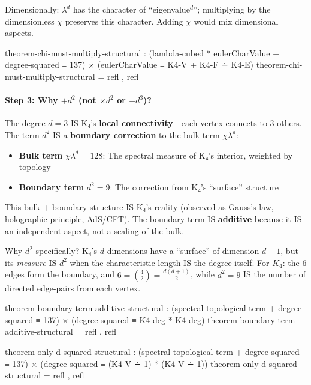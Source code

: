 \documentclass[11pt,a4paper]{book}
\begin{document}
Dimensionally: $\lambda^d$ has the character of ``eigenvalue$^d$''; multiplying by the 
dimensionless $\chi$ preserves this character. Adding $\chi$ would mix dimensional aspects.

\begin{code}
theorem-chi-must-multiply-structural : 
  (lambda-cubed * eulerCharValue + degree-squared ≡ 137) ×
  (eulerCharValue ≡ K4-V + K4-F ∸ K4-E)
theorem-chi-must-multiply-structural = refl , refl
\end{code}

\paragraph{Step 3: Why $+ d^2$ (not $\times d^2$ or $+ d^3$)?}

The degree $d = 3$ IS K₄'s \textbf{local connectivity}—each vertex connects 
to 3 others. The term $d^2$ IS a \textbf{boundary correction} to the bulk 
term $\chi \lambda^d$:

\begin{itemize}
\item \textbf{Bulk term} $\chi \lambda^d = 128$: The spectral measure of K₄'s 
      interior, weighted by topology
\item \textbf{Boundary term} $d^2 = 9$: The correction from K₄'s ``surface'' 
      structure
\end{itemize}

This bulk + boundary structure IS K₄'s reality (observed as Gauss's law, 
holographic principle, AdS/CFT). The boundary term IS \textbf{additive} 
because it IS an independent aspect, not a scaling of the bulk.

Why $d^2$ specifically? K₄'s $d$ dimensions have a ``surface'' of dimension $d-1$, 
but its \emph{measure} IS $d^2$ when the characteristic length IS the 
degree itself. For $K_4$: the 6 edges form the boundary, and $6 = \binom{4}{2} 
= \frac{d(d+1)}{2}$, while $d^2 = 9$ IS the number of directed edge-pairs 
from each vertex.

\begin{code}
theorem-boundary-term-additive-structural : 
  (spectral-topological-term + degree-squared ≡ 137) ×
  (degree-squared ≡ K4-deg * K4-deg)
theorem-boundary-term-additive-structural = refl , refl

theorem-only-d-squared-structural : 
  (spectral-topological-term + degree-squared ≡ 137) ×
  (degree-squared ≡ (K4-V ∸ 1) * (K4-V ∸ 1))
theorem-only-d-squared-structural = refl , refl
\end{code}
\end{document}
